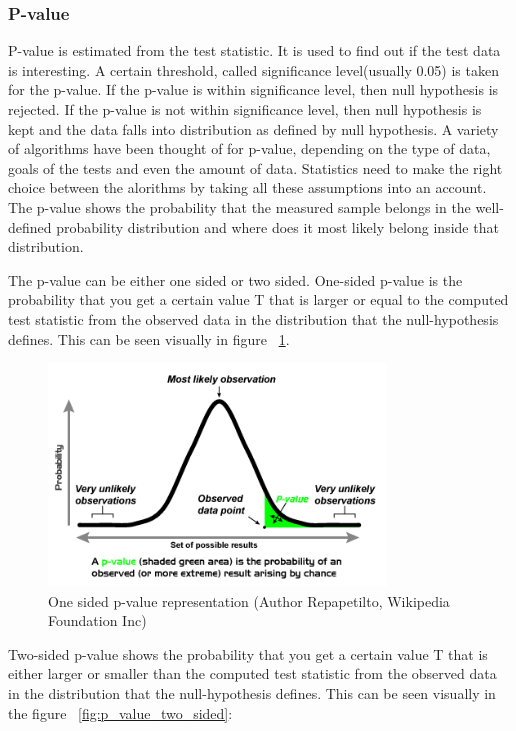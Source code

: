 \documentclass[12pt]{article}
\begin{document}
\subsubsection{P-value}
P-value is estimated from the test statistic. It is used to find out if the test data is interesting. A certain threshold, called significance level(usually 0.05) is taken for the p-value. If the p-value is within significance level, then null hypothesis is rejected. If the p-value is not within significance level, then null hypothesis is kept and the data falls into distribution as defined by null hypothesis. A variety of algorithms have been thought of for p-value, depending on the type of data, goals of the tests and even the amount of data. Statistics need to make the right choice between the alorithms by taking all these assumptions into an account. The p-value shows the probability that the measured sample belongs in the well-defined probability distribution and where does it most likely belong inside that distribution.

The p-value can be either one sided or two sided. One-sided p-value is the probability that you get a certain value T that is larger or equal to the computed test statistic from the observed data in the distribution that the null-hypothesis defines. This can be seen visually in figure ~\ref{fig:p_value_one_sided}.

\begin{figure}[!ht]
  \centering
  \includegraphics[width=0.8\textwidth]{p_value_one_sided}
  \caption{One sided p-value representation (Author Repapetilto, Wikipedia Foundation Inc)}
  \label{fig:p_value_one_sided}
\end{figure}

Two-sided p-value shows the probability that you get a certain value T that is either larger or smaller than the computed test statistic from the observed data in the distribution that the null-hypothesis defines. This can be seen visually in the figure ~\ref{fig:p_value_two_sided}:
\end{document}
